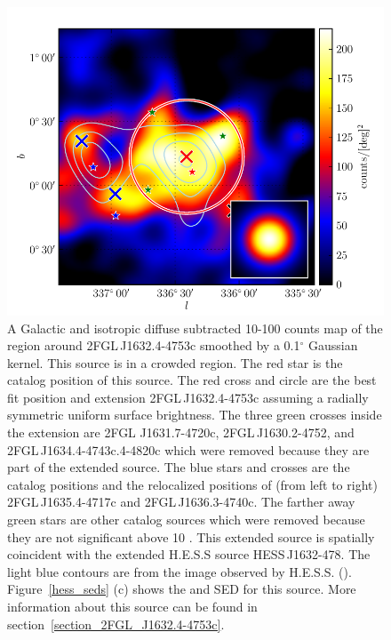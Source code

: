 \documentclass[12pt,preprint]{aastex}
\newcommand{\gev}{\text{GeV}\xspace}
\newcommand{\tev}{\text{TeV}\xspace}
\renewcommand{\deg}{\ensuremath{^\circ}\xspace}
\begin{document}
\begin{figure}
  \begin{center}
    \includegraphics[type=pdf,ext=.pdf,read=.pdf]{source_plots/source_1FGL_J1632.9-4802c}
  \end{center}
  \caption{A Galactic and isotropic diffuse subtracted 10-100
  \gev counts map of the region around 2FGL\,J1632.4-4753c smoothed by
  a 0.1\deg Gaussian kernel.  This source is in a crowded region.
  The red star is the catalog position of this source.  The red
  cross and circle are the best fit position and extension 2FGL\,J1632.4-4753c 
  assuming a radially
  symmetric uniform surface brightness.
  The three
  green crosses inside the extension are 2FGL
  J1631.7-4720c, 2FGL\,J1630.2-4752, and 2FGL\,J1634.4-4743c.4-4820c
  which were removed because they are part
  of the extended source.  The blue stars and crosses are the catalog
  positions and the relocalized positions of (from left to right)
  2FGL\,J1635.4-4717c and 2FGL\,J1636.3-4740c.  The farther away green
  stars are other catalog sources which were removed because they are
  not significant above 10 \gev.  This extended source is spatially
  coincident with the extended H.E.S.S source HESS\,J1632-478.
  The light blue contours are from the \tev image observed by H.E.S.S.
  (\cite{hess_plane_survey}).  Figure~\ref{hess_seds} (c) shows the \gev and
  \tev SED for this source.  More information about this source can be
  found in section~\ref{section_2FGL_J1632.4-4753c}.
  }\label{1FGL_J1632.9-4802c}
\end{figure}
\end{document}
